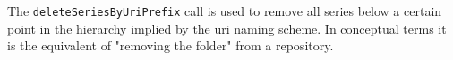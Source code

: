 The \verb+deleteSeriesByUriPrefix+ call is used to remove all series below a certain
point in the hierarchy implied by the uri naming scheme. In conceptual terms it is
the equivalent of "removing the folder" from a repository.
